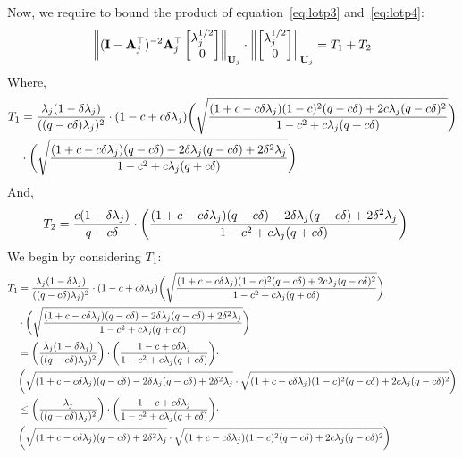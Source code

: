 Now, we require to bound the product of equation~\ref{eq:lotp3} and~\ref{eq:lotp4}:
\begin{align}
\label{eq:lotp5}
\left\lVert(\mathbf{I}-\mathbf{A}_j^{\top})^{-2}\mathbf{A}_j^{\top}\begin{bmatrix}\lambda_j^{1/2}\\0\end{bmatrix}\right\rVert_{\mathbf{U}_j}\cdot\left\lVert\begin{bmatrix}\lambda_j^{1/2}\\0\end{bmatrix}\right\rVert_{\mathbf{U}_j}=T_1+T_2
\end{align}
Where, 
\begin{align*}
T_1&=\frac{\lambda_j(1-\delta\lambda_j)}{((q -c\delta)\lambda_j)^2}\cdot(1-c+c\delta\lambda_j)\bigg(\sqrt{\frac{(1+c-c\delta\lambda_j)(1-c)^2(q -c\delta)+2c\lambda_j(q -c\delta)^2}{1-c^2+c\lambda_j(q +c\delta)}}\bigg)\nonumber\\&\cdot\bigg(\sqrt{\frac{(1+c-c\delta\lambda_j)(q -c\delta)-2\delta\lambda_j(q -c\delta)+2\delta^2\lambda_j}{1-c^2+c\lambda_j(q +c\delta)}}\bigg)\nonumber
\end{align*}
And,
\begin{align*}
T_2&=\frac{c(1-\delta\lambda_j)}{q -c\delta}\cdot\bigg(\frac{(1+c-c\delta\lambda_j)(q -c\delta)-2\delta\lambda_j(q -c\delta)+2\delta^2\lambda_j}{1-c^2+c\lambda_j(q +c\delta)}\bigg)
\end{align*}
We begin by considering $T_1$:
\begin{align}
\label{eq:lotp51}
T_1&=\frac{\lambda_j(1-\delta\lambda_j)}{((q -c\delta)\lambda_j)^2}\cdot(1-c+c\delta\lambda_j)\bigg(\sqrt{\frac{(1+c-c\delta\lambda_j)(1-c)^2(q -c\delta)+2c\lambda_j(q -c\delta)^2}{1-c^2+c\lambda_j(q +c\delta)}}\bigg)\nonumber\\&\cdot\bigg(\sqrt{\frac{(1+c-c\delta\lambda_j)(q -c\delta)-2\delta\lambda_j(q -c\delta)+2\delta^2\lambda_j}{1-c^2+c\lambda_j(q +c\delta)}}\bigg)\nonumber\\
&=\bigg(\frac{\lambda_j(1-\delta\lambda_j)}{((q -c\delta)\lambda_j)^2}\bigg)\cdot\bigg(\frac{1-c+c\delta\lambda_j}{1-c^2+c\lambda_j(q +c\delta)}\bigg)\cdot\nonumber\\&\bigg(\sqrt{(1+c-c\delta\lambda_j)(q -c\delta)-2\delta\lambda_j(q -c\delta)+2\delta^2\lambda_j}\cdot\sqrt{(1+c-c\delta\lambda_j)(1-c)^2(q -c\delta)+2c\lambda_j(q -c\delta)^2}\bigg)\nonumber\\
&\leq\bigg(\frac{\lambda_j}{((q -c\delta)\lambda_j)^2}\bigg)\cdot\bigg(\frac{1-c+c\delta\lambda_j}{1-c^2+c\lambda_j(q +c\delta)}\bigg)\cdot\nonumber\\&\bigg(\sqrt{(1+c-c\delta\lambda_j)(q -c\delta)+2\delta^2\lambda_j}\cdot\sqrt{(1+c-c\delta\lambda_j)(1-c)^2(q -c\delta)+2c\lambda_j(q -c\delta)^2}\bigg)
\end{align}
